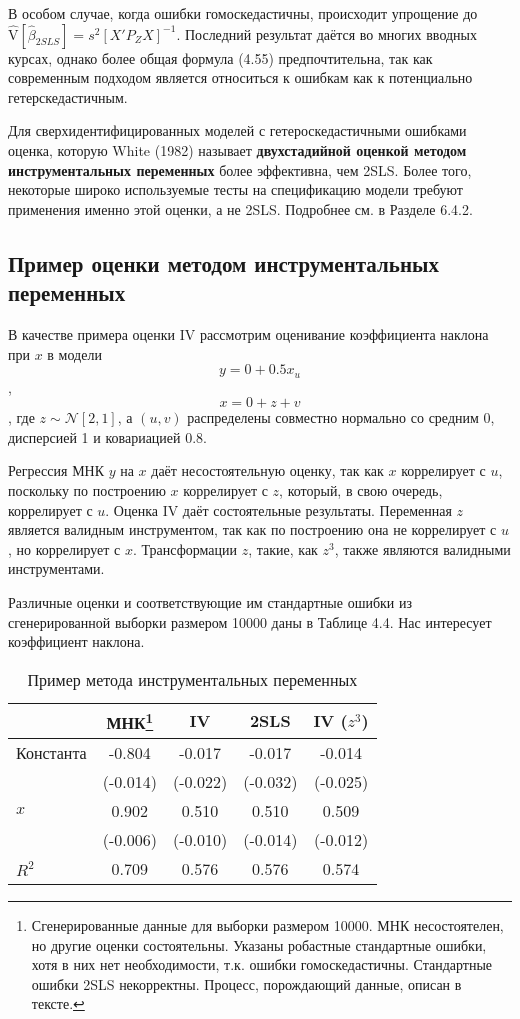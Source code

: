 В особом случае, когда ошибки гомоскедастичны, происходит упрощение до $\hat{\mathrm{V}}[\hat{\beta}_{2SLS}] = s^2 [X'P_ZX]^{-1}$. Последний результат даётся во многих вводных курсах, однако более общая формула (4.55) предпочтительна, так как современным подходом является относиться к ошибкам как к потенциально гетерскедастичным.

Для сверхидентифицированных моделей с гетероскедастичными ошибками оценка, которую White (1982) называет \textbf{двухстадийной оценкой методом инструментальных переменных} более эффективна, чем 2SLS. Более того, некоторые широко используемые тесты на спецификацию модели требуют применения именно этой оценки, а не 2SLS. Подробнее см. в Разделе 6.4.2.

\subsection{Пример оценки методом инструментальных переменных}

В качестве примера оценки IV рассмотрим оценивание коэффициента наклона при $x$ в модели	
$$ y = 0+0.5x_u $$,
$$x = 0+z+v $$,
где $z \sim \mathcal{N} [2,1]$, а $(u,v)$ распределены совместно нормально со средним 0, дисперсией 1 и ковариацией 0.8. 

Регрессия МНК $y$ на $x$ даёт несостоятельную оценку, так как $x$ коррелирует с $u$, поскольку по построению $x$ коррелирует с $z$, который, в свою очередь, коррелирует с  $u$. Оценка IV даёт состоятельные результаты. Переменная $z$ является валидным инструментом, так как по построению она не коррелирует с $u$, но коррелирует с $x$. Трансформации $z$, такие, как $z^3$, также являются валидными инструментами.

Различные оценки и соответствующие им стандартные ошибки из сгенерированной выборки размером 10000 даны в Таблице 4.4. Нас интересует коэффициент наклона. 

\begin{table}[h]
\caption{\label{tab:iv}Пример метода инструментальных переменных}
\begin{minipage}{\textwidth}
\begin{tabular}[t]{lcccc}
\hline
\hline
& \bf{МНК}\footnote{Сгенерированные данные для выборки размером 10000. МНК несостоятелен, но другие оценки состоятельны. Указаны робастные стандартные ошибки, хотя в них нет необходимости, т.к. ошибки гомоскедастичны. Стандартные ошибки 2SLS некорректны. Процесс, порождающий данные, описан в тексте.} & \bf{IV} & \bf{2SLS} & \bf{IV ($z^3$)}  \\
\hline
Константа & -0.804 & -0.017 & -0.017 & -0.014 \\
 & (-0.014) & (-0.022) & (-0.032) & (-0.025) \\
$x$ & 0.902 & 0.510 & 0.510 & 0.509 \\
 & (-0.006) & (-0.010) & (-0.014) & (-0.012) \\
$R^2$ & 0.709 & 0.576 & 0.576 & 0.574 \\
\hline
\hline
\end{tabular}
\end{minipage}
\end{table}

